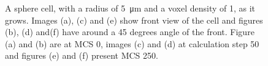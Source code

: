 \begin{figure}[ht]
\begin{center}
{	}
	\end{center}
	\caption[Growth of a sphere cell with a radius of 5]{\label{img:GrowthSphereCellRadius5}A sphere cell, with a radius of \SI{5}{\micro\metre} and a voxel density of 1, as it grows. Images (a), (c) and (e) show front view of the cell and figures (b), (d) and(f) have around a 45 degrees angle of the front. Figure (a) and (b) are at \ac{MCS} 0, images (c) and (d) at calculation step 50 and figures (e) and (f) present \ac{MCS} 250.}
\end{figure}

